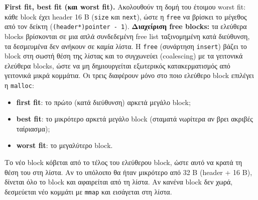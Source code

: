 \documentclass[11pt,a4paper]{article}
\newcommand{\en}[1]{\textlatin{#1}}
\begin{document}
\textbf{\en{First fit}, \en{best fit} (και \en{worst fit}).} Ακολουθούν τη δομή του έτοιμου \en{worst fit}: κάθε \en{block} έχει \en{header} 16 \en{B} (\en{\texttt{size}} και \en{\texttt{next}}), ώστε η \en{\texttt{free}} να βρίσκει το μέγεθος από τον δείκτη (\en{\texttt{(header*)pointer - 1}}). \textbf{Διαχείριση \en{free blocks}:} τα ελεύθερα \en{blocks} βρίσκονται σε μια απλά συνδεδεμένη \en{free list} ταξινομημένη κατά διεύθυνση, τα δεσμευμένα δεν ανήκουν σε καμία λίστα. Η \en{\texttt{free}} (συνάρτηση \en{\texttt{insert}}) βάζει το \en{block} στη σωστή θέση της λίστας και το συγχωνεύει (\en{coalescing}) με τα γειτονικά ελεύθερα \en{blocks}, ώστε να μη δημιουργείται εξωτερικός κατακερματισμός από γειτονικά μικρά κομμάτια. Οι τρεις διαφέρουν μόνο στο ποιο ελεύθερο \en{block} επιλέγει η \en{\texttt{malloc}}:
\begin{itemize}
    \item \en{\textbf{first fit}}: το πρώτο (κατά διεύθυνση) αρκετά μεγάλο \en{block};
    \item \en{\textbf{best fit}}: το μικρότερο αρκετά μεγάλο \en{block} (σταματά νωρίτερα αν βρει ακριβές ταίριασμα);
    \item \en{\textbf{worst fit}}: το μεγαλύτερο \en{block}.
\end{itemize}
Το νέο \en{block} κόβεται από το τέλος του ελεύθερου \en{block}, ώστε αυτό να κρατά τη θέση του στη λίστα. Αν το υπόλοιπο θα ήταν μικρότερο από 32 \en{B} (\en{header} + 16 \en{B}), δίνεται όλο το \en{block} και αφαιρείται από τη λίστα. Αν κανένα \en{block} δεν χωρά, δεσμεύεται νέο κομμάτι με \en{\texttt{mmap}} και εισάγεται στη λίστα.
\end{document}
